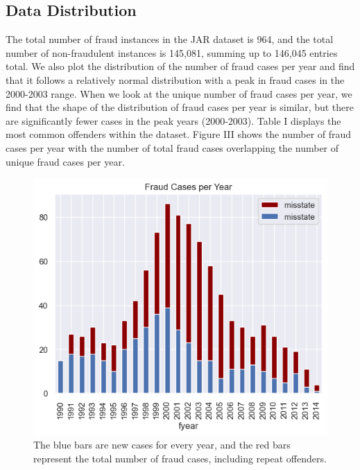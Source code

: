 \documentclass[conference]{IEEEtran}
\begin{document}
\subsection{Data Distribution}
The total number of fraud instances in the JAR dataset is 964, and the total number of non-fraudulent instances is 145,081, summing up to 146,045 entries total. We also plot the distribution of the number of fraud cases per year and find that it follows a relatively normal distribution with a peak in fraud cases in the 2000-2003 range. When we look at the unique number of fraud cases per year, we find that the shape of the distribution of fraud cases per year is similar, but there are significantly fewer cases in the peak years (2000-2003). Table I displays the most common offenders within the dataset. Figure III shows the number of fraud cases per year with the number of total fraud cases overlapping the number of unique fraud cases per year. \vspace{10pt}
\begin{figure}[htbp]
\centerline{\includegraphics[width=\columnwidth]{fraudoverlap}}
\caption{The blue bars are new cases for every year, and the red bars represent the total number of fraud cases, including repeat offenders.}
\label{fig}
\end{figure} \vspace{10pt}
\end{document}
